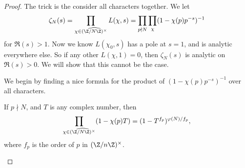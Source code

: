 \documentclass[a4paper]{article}
\begin{document}
\begin{proof}
  The trick is the consider all characters together. We let
  \[
    \zeta_N(s) = \prod_{\chi \in \widehat{(\Z/N\Z)^\times}} L(\chi, s) = \prod_{p \nmid N} \prod_\chi (1 - \chi(p) p^{-s})^{-1}
  \]
  for $\Re(s) > 1$. Now we know $L(\chi_0, s)$ has a pole at $s = 1$, and is analytic everywhere else. So if any other $L(\chi, 1) = 0$, then $\zeta_N(s)$ is analytic on $\Re(s) > 0$. We will show that this cannot be the case.

  We begin by finding a nice formula for the product of $(1 - \chi(p) p^{-s})^{-1}$ over all characters.
  \begin{claim}
    If $p \nmid N$, and $T$ is any complex number, then
    \[
      \prod_{\chi \in \widehat{(\Z/N\Z)^\times}} (1 - \chi(p) T) = (1 - T^{f_p})^{\varphi(N)/f_p},
    \]
    where $f_p$ is the order of $p$ in $(\Z/n\Z)^\times$.


\end{claim}
\end{proof}
\end{document}
